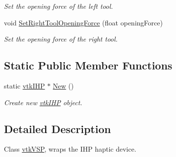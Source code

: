 \begin{DoxyCompactItemize}
\begin{DoxyCompactList}\small\item\em Set the opening force of the left tool. \item\end{DoxyCompactList}\item 
\hypertarget{classvtkIHP_ada52401a0aee8798419e646a5007564f}{
void \hyperlink{classvtkIHP_ada52401a0aee8798419e646a5007564f}{SetRightToolOpeningForce} (float openingForce)}
\label{classvtkIHP_ada52401a0aee8798419e646a5007564f}

\begin{DoxyCompactList}\small\item\em Set the opening force of the right tool. \item\end{DoxyCompactList}\end{DoxyCompactItemize}
\subsection*{Static Public Member Functions}
\begin{DoxyCompactItemize}
\item 
\hypertarget{classvtkIHP_affd59f555c461c184edfd5e1072ebe79}{
static \hyperlink{classvtkIHP}{vtkIHP} $\ast$ \hyperlink{classvtkIHP_affd59f555c461c184edfd5e1072ebe79}{New} ()}
\label{classvtkIHP_affd59f555c461c184edfd5e1072ebe79}

\begin{DoxyCompactList}\small\item\em Create new \hyperlink{classvtkIHP}{vtkIHP} object. \item\end{DoxyCompactList}\end{DoxyCompactItemize}


\subsection{Detailed Description}
Class \hyperlink{classvtkVSP}{vtkVSP}, wraps the IHP haptic device. 

